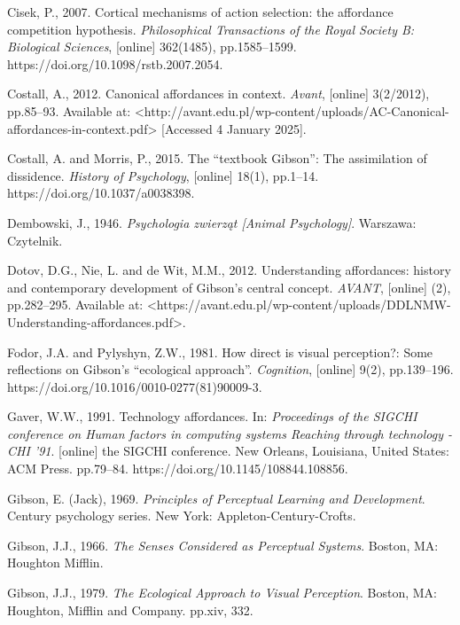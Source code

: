Cisek, P., 2007. Cortical mechanisms of action selection: the affordance competition hypothesis. \textit{Philosophical Transactions of the Royal Society B: Biological Sciences}, [online] 362(1485), pp.1585–1599. https://doi.org/10.1098/rstb.2007.2054.



Costall, A., 2012. Canonical affordances in context. \textit{Avant}, [online] 3(2/2012), pp.85–93. Available at: {\textless}http://avant.edu.pl/wp-content/uploads/AC-Canonical-affordances-in-context.pdf{\textgreater} [Accessed 4 January 2025].



Costall, A. and Morris, P., 2015. The ``textbook Gibson'': The assimilation of dissidence. \textit{History of Psychology}, [online] 18(1), pp.1–14. https://doi.org/10.1037/a0038398.



Dembowski, J., 1946. \textit{Psychologia zwierząt [Animal Psychology]}. Warszawa: Czytelnik.



Dotov, D.G., Nie, L. and de Wit, M.M., 2012. Understanding affordances: history and contemporary development of Gibson's central concept. \textit{AVANT}, [online] (2), pp.282–295. Available at: {\textless}https://avant.edu.pl/wp-content/uploads/DDLNMW-Understanding-affordances.pdf{\textgreater}.



Fodor, J.A. and Pylyshyn, Z.W., 1981. How direct is visual perception?: Some reflections on Gibson's ``ecological approach''. \textit{Cognition}, [online] 9(2), pp.139–196. https://doi.org/10.1016/0010-0277(81)90009-3.



Gaver, W.W., 1991. Technology affordances. In: \textit{Proceedings of the SIGCHI conference on Human factors in computing systems Reaching through technology - CHI '91}. [online] the SIGCHI conference. New Orleans, Louisiana, United States: ACM Press. pp.79–84. https://doi.org/10.1145/108844.108856.



Gibson, E. (Jack), 1969. \textit{Principles of Perceptual Learning and Development}. Century psychology series. New York: Appleton-Century-Crofts.



Gibson, J.J., 1966. \textit{The Senses Considered as Perceptual Systems}. Boston, MA: Houghton Mifflin.



Gibson, J.J., 1979. \textit{The Ecological Approach to Visual Perception}. Boston, MA: Houghton, Mifflin and Company. pp.xiv, 332.



